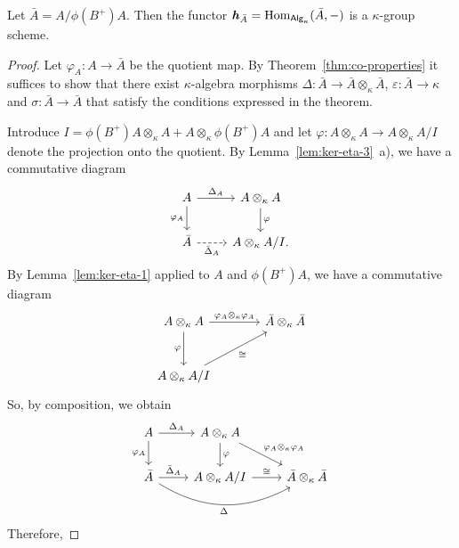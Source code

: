 \begin{thm}
    Let $\bar A=A/\phi(B^+)A$. Then the functor\/ $\textrm{\boldmath$\mathit h$}_{\bar A}={\rm Hom}_{\mathsf{Alg}_\kappa}(\bar A,-)$ is a\/ $\kappa$-group scheme.
\end{thm}

\begin{proof}
    Let $\varphi_A\colon A\to\bar A$ be the quotient map. By Theorem~\ref{thm:co-properties} it suffices to show that there exist $\kappa$-algebra morphisms $\Delta\colon\bar A\to \bar A\otimes_\kappa\bar A$, $\varepsilon\colon\bar A\to\kappa$ and $\sigma\colon\bar A\to\bar A$ that satisfy the conditions expressed in the theorem.

    Introduce $I=\phi(B^+)A\otimes_\kappa A + A\otimes_\kappa\phi(B^+)A$ and let $\varphi\colon A\otimes_\kappa A\to A\otimes_\kappa A/I$ denote the projection onto the quotient. By Lemma~\ref{lem:ker-eta-3}~a), we have a commutative diagram
    $$
        \begin{tikzcd}
            A
                    \arrow[r,"\Delta_A"]
                    \arrow[d,"\varphi_A"']
                &A\otimes_\kappa A\arrow[d,"\varphi"]\\
            \bar A
                    \arrow[r,dashed,"\bar\Delta_A"']
                &A\otimes_\kappa A/I.
        \end{tikzcd}
    $$
    By Lemma~\ref{lem:ker-eta-1} applied to $A$ and $\phi(B^+)A$, we have a commutative diagram
    $$
        \begin{tikzcd}[column sep=large, row sep=large]
            A\otimes_\kappa A
                    \arrow[d,"\varphi"']
                    \arrow[r,"\varphi_A\otimes_\kappa\varphi_A"]
                &\bar A\otimes_\kappa \bar A\\
            A\otimes_\kappa A/I
                \arrow[ru,"\cong"']
        \end{tikzcd}
    $$
    So, by composition, we obtain
    $$
        \begin{tikzcd}
            A
                    \arrow[r,"\Delta_A"]
                    \arrow[d,"\varphi_A"']
                &A\otimes_\kappa A\arrow[d,"\varphi"]
                    \arrow[rd,"\varphi_A\otimes_\kappa\varphi_A"]\\
            \bar A\arrow[r,"\bar\Delta_A"]
                    \arrow[rr,"\Delta"',bend right]
                &A\otimes_\kappa A/I
                    \arrow[r,"\cong"]
                &\bar A\otimes_\kappa\bar A
        \end{tikzcd}
    $$
    Therefore,

\end{proof}
